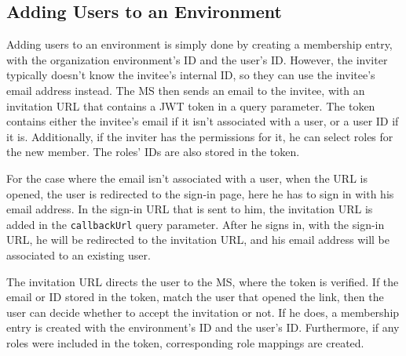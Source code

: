 
\subsection{Adding Users to an Environment}

Adding users to an environment is simply done by creating a membership entry, with the
organization environment's ID and the user's ID.
However, the inviter typically doesn't know the invitee's internal ID,
so they can use the invitee's email address instead.
The MS then sends an email to the invitee, with an invitation URL that contains a JWT
token in a query parameter.
The token contains either the invitee's email if it isn't associated with a user, or a
user ID if it is.
Additionally, if the inviter has the permissions for it, he can select roles for the new member.
The roles' IDs are also stored in the token.

For the case where the email isn't associated with a user, when the URL is opened, the
user is redirected to the sign-in page, here he has to sign in with his email address.
In the sign-in URL that is sent to him, the invitation URL is added in the
\lstinline{callbackUrl} query parameter.
After he signs in, with the sign-in URL, he will be redirected to the invitation URL, and
his email address will be associated to an existing user.

The invitation URL directs the user to the MS, where the token is verified.
If the email or ID stored in the token, match the user that opened the link, then the user
can decide whether to accept the invitation or not.
If he does, a membership entry is created with the environment's ID and the user's ID.
Furthermore, if any roles were included in the token, corresponding role mappings are created.


